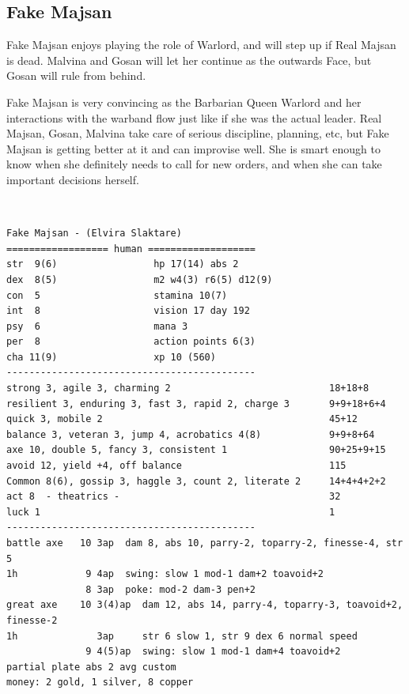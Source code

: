 \clearpage
\begin{samepage}
\subsection*{Fake Majsan}
Fake Majsan enjoys playing the role of Warlord, and will step up if Real Majsan is dead. Malvina and Gosan will let her continue as the outwards Face, but Gosan will rule from behind.

Fake Majsan is very convincing as the Barbarian Queen Warlord and her interactions with the warband flow just like if she was the actual leader. Real Majsan, Gosan, Malvina take care of serious discipline, planning, etc, but Fake Majsan is getting better at it and can improvise well. She is smart enough to know when she definitely needs to call for new orders, and when she can take important decisions herself.

\

\small \begin{verbatim}
Fake Majsan - (Elvira Slaktare)
================== human ===================
str  9(6)                 hp 17(14) abs 2
dex  8(5)                 m2 w4(3) r6(5) d12(9)
con  5                    stamina 10(7)
int  8                    vision 17 day 192
psy  6                    mana 3
per  8                    action points 6(3)
cha 11(9)                 xp 10 (560)
--------------------------------------------
strong 3, agile 3, charming 2                            18+18+8
resilient 3, enduring 3, fast 3, rapid 2, charge 3       9+9+18+6+4
quick 3, mobile 2                                        45+12
balance 3, veteran 3, jump 4, acrobatics 4(8)            9+9+8+64
axe 10, double 5, fancy 3, consistent 1                  90+25+9+15
avoid 12, yield +4, off balance                          115
Common 8(6), gossip 3, haggle 3, count 2, literate 2     14+4+4+2+2
act 8  - theatrics -                                     32
luck 1                                                   1
--------------------------------------------
battle axe   10 3ap  dam 8, abs 10, parry-2, toparry-2, finesse-4, str 5
1h            9 4ap  swing: slow 1 mod-1 dam+2 toavoid+2
              8 3ap  poke: mod-2 dam-3 pen+2
great axe    10 3(4)ap  dam 12, abs 14, parry-4, toparry-3, toavoid+2, finesse-2
1h              3ap     str 6 slow 1, str 9 dex 6 normal speed
              9 4(5)ap  swing: slow 1 mod-1 dam+4 toavoid+2
partial plate abs 2 avg custom
money: 2 gold, 1 silver, 8 copper
\end{verbatim} \normalsize
\end{samepage}







